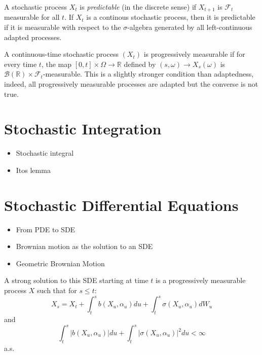 \begin{definition}
    A stochastic process $X_t$ is \emph{predictable} (in the discrete sense) 
    if $X_{t+1}$ is $\mathcal{F}_{t}$ measurable for all $t$. If $X_t$
    is a continous stochastic process, then it is predictable if it is 
    measurable with respect to the $\sigma$-algebra generated by all left-continuous
    adapted processes.
\end{definition}

\begin{definition}
    A continuous-time stochastic process $(X_t)$ is progressively measurable if
    for every time $t$, the map $[0,t]\times\Omega\rightarrow\mathbb{R}$ defined
    by $(s,\omega)\rightarrow X_s(\omega)$ is $\mathcal{B}(\mathbb{R})\times\mathcal{F}_t$-measurable.
    This is a slightly stronger condition than adaptedness, indeed, all progressively
    measurable processes are adapted but the converse is not true. 
\end{definition}


\section{Stochastic Integration}
\begin{itemize}
    \item Stochastic integral
    \item Itos lemma
\end{itemize}

\section{Stochastic Differential Equations}\label{sec:1.6}
\begin{itemize}
    \item From PDE to SDE
    \item Brownian motion as the solution to an SDE
    \item Geometric Brownian Motion
\end{itemize}

\begin{definition}
    A strong solution to this SDE starting at time $t$ is a progressively measurable process $X$ such that for $s\leq t$:
    $$X_s=X_t+\int_{t}^{s}b(X_u,\alpha_u)du+\int_t^s\sigma(X_u,\alpha_u)dW_u$$
    and
    $$\int_t^s|b(X_u,\alpha_u)|du+\int_t^s|\sigma(X_u,\alpha_u)|^2du<\infty$$
    a.s.
\end{definition}

